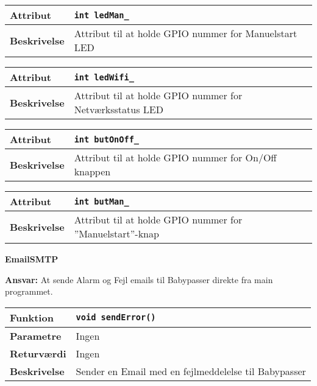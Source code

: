 \begin{center}
    \begin{tabular}{ | l | p{} |}
    \hline
    \textbf{Attribut}		& \verb+int ledMan_ +										\\ \hline
    \textbf{Beskrivelse} 	& Attribut til at holde GPIO nummer for Manuelstart LED		\\ \hline
    \end{tabular}
\end{center}

\begin{center}
    \begin{tabular}{ | l | p{} |}
    \hline
	\textbf{Attribut}	& \verb+int ledWifi_ +										\\ \hline
	\textbf{Beskrivelse}	& Attribut til at holde GPIO nummer for Netværksstatus LED	\\ \hline
    \end{tabular}
\end{center}

\begin{center}
    \begin{tabular}{ | l | p{} |}
    \hline
    \textbf{Attribut}		& \verb+int butOnOff_ +										\\ \hline
    \textbf{Beskrivelse} 	& Attribut til at holde GPIO nummer for On/Off knappen		\\ \hline
    \end{tabular}
\end{center}

\begin{center}
    \begin{tabular}{ | l | p{} |}
    \hline
    \textbf{Attribut}		& \verb+int butMan_ +											\\ \hline
    \textbf{Beskrivelse} 	& Attribut til at holde GPIO nummer for ''Manuelstart''-knap		\\ \hline
    \end{tabular}
\end{center}

{\centering
\textbf{EmailSMTP}\par
}
\textbf{Ansvar:} At sende Alarm og Fejl emails til Babypasser direkte fra main programmet. \

\begin{center}
    \begin{tabular}{ | l | p{} |}
    \hline
    \textbf{Funktion}	& \verb+void sendError() +								\\ \hline
    \textbf{Parametre} 	& Ingen													\\ \hline
    \textbf{Returværdi}	& Ingen													\\ \hline
    \textbf{Beskrivelse}	& Sender en Email med en fejlmeddelelse til Babypasser	\\ \hline
    \end{tabular}
\end{center}

